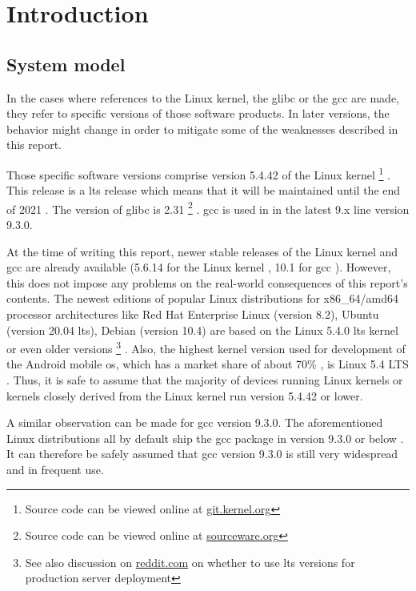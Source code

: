 \chapter{Introduction}
\label{chp:introduction}

\section{System model}
\label{sec:system-model}

In the cases where references to the Linux kernel, the \gls{glibc} or the \gls{gcc} are made, they refer to specific versions of those software products.
In later versions, the behavior might change in order to mitigate some of the weaknesses described in this report.

Those specific software versions comprise version 5.4.42 of the Linux kernel%
	\footnote{Source code can be viewed online at \href{https://git.kernel.org/stable/h/v5.4.42}{git.kernel.org}}%
.
This release is a \gls{lts} release which means that it will be maintained until the end of 2021 \cite{linux-release}.
The version of \gls{glibc} is 2.31%
	\footnote{Source code can be viewed online at \href{https://sourceware.org/git/?p=glibc.git;a=tree;h=6ee690ef6fa36bf79d2e05b5a30a4f7e10ba3937;hb=9ea3686266dca3f004ba874745a4087a89682617}{sourceware.org}}%
.
\gls{gcc} is used in in the latest 9.x line version 9.3.0.

At the time of writing this report, newer stable releases of the Linux kernel and \gls{gcc} are already available (5.6.14 for the Linux kernel \cite{linux-kernel}, 10.1 for \gls{gcc} \cite{gcc-homepage}).
However, this does not impose any problems on the real-world consequences of this report's contents.
The newest editions of popular Linux distributions for x86\_64/amd64 processor architectures like Red Hat Enterprise Linux (version 8.2), Ubuntu (version 20.04 \gls{lts}), Debian (version 10.4) are based on the Linux 5.4.0 \gls{lts} kernel or even older versions%
	\footnote{See also discussion on \href{https://www.reddit.com/r/webhosting/comments/beg0z0/should_i_use_an_lts_version_of_ubuntu_for_my_web/}{reddit.com} on whether to use \gls{lts} versions for production server deployment}%
\cites{rhel-release}{ubuntu-release}{debian-release}{debian-kernel}.
Also, the highest kernel version used for development of the Android mobile \gls{os}, which has a market share of about 70\% \cite{android-market-share}, is Linux 5.4 LTS \cite{android-release}.
Thus, it is safe to assume that the majority of devices running Linux kernels or kernels closely derived from the Linux kernel run version 5.4.42 or lower.

A similar observation can be made for \gls{gcc} version 9.3.0.
The aforementioned Linux distributions all by default ship the \gls{gcc} package in version 9.3.0 or below \cites{rhel-gcc}{ubuntu-gcc}{debian-gcc}.
It can therefore be safely assumed that \gls{gcc} version 9.3.0 is still very widespread and in frequent use.
